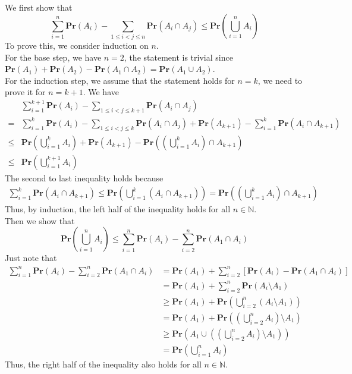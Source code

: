 \documentclass[a4paper, justified]{tufte-handout}
\begin{document}
\begin{solution}
  We first show that 
  \[\sum_{i=1}^n \mathbf{Pr}(A_i) - \sum_{1 \le i < j \le n} \mathbf{Pr}(A_i \cap A_j)\le \mathbf{Pr}\left(\bigcup_{i=1}^n A_i\right)\]
  To prove this, we consider induction on $n$.\\
  For the base step, we have $n = 2$, the statement is trivial since $\mathbf{Pr}(A_1) + \mathbf{Pr}(A_2) - \mathbf{Pr}(A_1 \cap A_2) = \mathbf{Pr}(A_1 \cup A_2)$.\\
  For the induction step, we assume that the statement holds for $n = k$, we need to prove it for $n = k + 1$. We have
  \[\begin{aligned}
    &\sum_{i=1}^{k+1} \mathbf{Pr}(A_i) - \sum_{1 \le i < j \le k+1} \mathbf{Pr}(A_i \cap A_j)\\
    =& \sum_{i=1}^{k} \mathbf{Pr}(A_i) - \sum_{1 \le i < j \le k} \mathbf{Pr}(A_i \cap A_j) + \mathbf{Pr}(A_{k+1}) - \sum_{i=1}^k \mathbf{Pr}(A_i \cap A_{k+1})\\
    \le& \mathbf{Pr}\left(\bigcup_{i=1}^k A_i\right) + \mathbf{Pr}(A_{k+1}) - \mathbf{Pr}\left(\left(\bigcup_{i=1}^k A_i\right) \cap A_{k+1}\right)\\
    \le& \mathbf{Pr}\left(\bigcup_{i=1}^{k+1} A_i\right)
  \end{aligned}
  \]
  The second to last inequality holds because 
  \[
  \begin{aligned}
    \sum_{i=1}^k \mathbf{Pr}(A_i \cap A_{k+1}) \le\mathbf{Pr}\left(\bigcup_{i=1}^k \left(A_i \cap A_{k+1}\right)\right) =\mathbf{Pr}\left(\left(\bigcup_{i=1}^k A_i\right) \cap A_{k+1}\right)
  \end{aligned}
  \]
  Thus, by induction, the left half of the inequality holds for all $n \in \mathbb{N}$.\\
  Then we show that
  \[\mathbf{Pr}\left(\bigcup_{i=1}^n A_i\right) \le \sum_{i=1}^n \mathbf{Pr} \left( A_i\right) - \sum_{i=2}^n \mathbf{Pr}(A_1 \cap A_i)\]
  Just note that 
  \[
  \begin{aligned}
    \sum_{i=1}^n \mathbf{Pr}(A_i) - \sum_{i=2}^n \mathbf{Pr}(A_1 \cap A_i) 
    &= \mathbf{Pr}(A_1) + \sum_{i=2}^n \left[\mathbf{Pr}(A_i) - \mathbf{Pr}(A_1 \cap A_i)\right]\\
    &= \mathbf{Pr}(A_1) + \sum_{i=2}^n \mathbf{Pr}(A_i \setminus A_1)\\
    &\ge \mathbf{Pr}(A_1) + \mathbf{Pr}\left(\bigcup_{i=2}^n \left(A_i \setminus A_1\right)\right)\\
    &= \mathbf{Pr}(A_1) + \mathbf{Pr}\left(\left(\bigcup_{i=2}^n A_i\right) \setminus A_1\right)\\
    &\ge \mathbf{Pr}\left(A_1 \cup \left(\left(\bigcup_{i=2}^n A_i\right) \setminus A_1\right)\right)\\
    &= \mathbf{Pr}\left(\bigcup_{i=1}^n A_i\right)
  \end{aligned}
  \]
  Thus, the right half of the inequality also holds for all $n \in \mathbb{N}$.
\end{solution}
\end{document}

